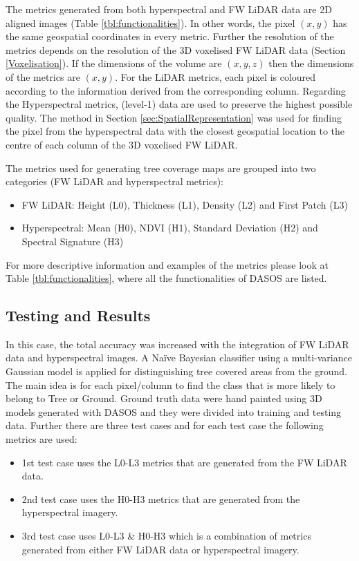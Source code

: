 \documentclass{subfiles}
\begin{document}
\par The metrics generated from both hyperspectral and FW LiDAR data are 2D aligned images (Table \ref{tbl:functionalities}). In other words, the pixel $(x, y)$ has the same geospatial coordinates in every metric. Further the resolution of the metrics depends on the resolution of the 3D voxelised FW LiDAR data (Section \ref{Voxelisation}). If the dimensions of the volume are $(x, y, z)$ then the dimensions of the metrics are $(x, y)$. For the LiDAR metrics, each pixel is coloured according to the information derived from the corresponding column. Regarding the Hyperspectral metrics, (level-1) data are used to preserve the highest possible quality. The method in Section \ref{sec:SpatialRepresentation} was used for finding the pixel from the hyperspectral data with the closest geospatial location to the centre of each column of the 3D voxelised FW LiDAR.

\par The metrics used for generating tree coverage maps are grouped into two categories (FW LiDAR and hyperspectral metrics):
\begin{itemize}
	\item FW LiDAR: Height (L0), Thickness (L1), Density (L2) and First Patch (L3)
	\item Hyperspectral: Mean (H0), NDVI (H1), Standard Deviation (H2) and Spectral Signature (H3)
\end{itemize}
For more descriptive information and examples of the metrics please look at Table \ref{tbl:functionalities}, where all the functionalities of DASOS are listed.  


\subsection{Testing and Results}

\par In this case, the total accuracy was increased with the integration of FW LiDAR data and hyperspectral images. A Naïve Bayesian classifier using a multi-variance Gaussian model is applied for distinguishing tree covered areas from the ground. The main idea is for each pixel/column to find the class that is more likely to belong to Tree or Ground.  Ground truth data were hand painted using 3D models generated with DASOS and they were divided into training and testing data. Further there are three test cases and for each test case the following metrics are used:

\begin{itemize}
	\item 1st test case uses the L0-L3 metrics that are generated from the FW LiDAR data.
	\item 2nd test case uses the H0-H3 metrics that are generated from the hyperspectral imagery.
	\item 3rd test case uses L0-L3 \& H0-H3 which is a combination of metrics generated from either FW LiDAR data or hyperspectral imagery. 
\end{itemize}
\end{document}
